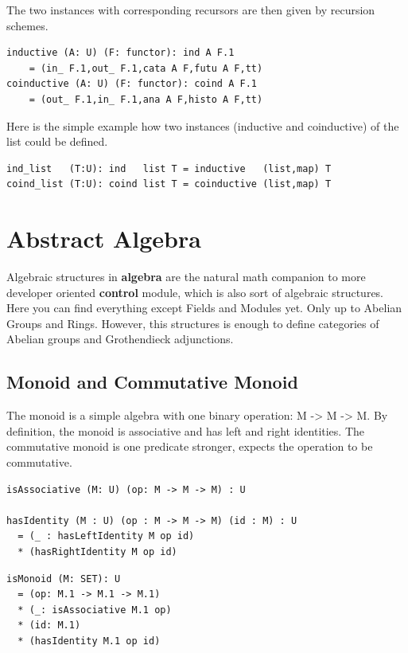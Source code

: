 \documentclass{article}
\begin{document}
The two instances with corresponding recursors are then given by recursion schemes.

\begin{lstlisting}[mathescape=true]
inductive (A: U) (F: functor): ind A F.1
    = (in_ F.1,out_ F.1,cata A F,futu A F,tt)
coinductive (A: U) (F: functor): coind A F.1
    = (out_ F.1,in_ F.1,ana A F,histo A F,tt)
\end{lstlisting}

Here is the simple example how two instances (inductive and coinductive) of the list could be defined.

\begin{lstlisting}[mathescape=true]
ind_list   (T:U): ind   list T = inductive   (list,map) T
coind_list (T:U): coind list T = coinductive (list,map) T
\end{lstlisting}

\section{Abstract Algebra}

Algebraic structures in {\bf algebra} are the natural math companion to
more developer oriented {\bf control} module, which is also sort of algebraic structures.
Here you can find everything except Fields and Modules yet. Only up to Abelian Groups and Rings.
However, this structures is enough to define categories of Abelian groups and Grothendieck adjunctions.

\subsection{Monoid and Commutative Monoid}

The monoid is a simple algebra with one binary operation: M -> M -> M.
By definition, the monoid is associative and has left and right identities.
The commutative monoid is one predicate stronger, expects the operation
to be commutative.

\begin{lstlisting}[mathescape=true]
isAssociative (M: U) (op: M -> M -> M) : U

hasIdentity (M : U) (op : M -> M -> M) (id : M) : U
  = (_ : hasLeftIdentity M op id)
  * (hasRightIdentity M op id)
\end{lstlisting}

\begin{lstlisting}[mathescape=true]
isMonoid (M: SET): U
  = (op: M.1 -> M.1 -> M.1)
  * (_: isAssociative M.1 op)
  * (id: M.1)
  * (hasIdentity M.1 op id)
\end{lstlisting}
\end{document}
